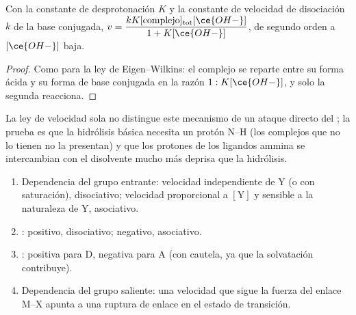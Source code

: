 \begin{proposition}\label{prop:b3:complex-mechanisms:conjugate-base}
Con la constante de desprotonación $K$ y la constante de velocidad de disociación $k$ de la
base conjugada, $v = \dfrac{kK[\text{complejo}]_{\mathrm{tot}}[\ce{OH-}]}{1 + K[\ce{OH-}]}$, de segundo orden a $[\ce{OH-}]$ baja.
\end{proposition}

\begin{proof}
Como para la ley de Eigen--Wilkins: el complejo se reparte entre su forma ácida y su
forma de base conjugada en la razón $1 : K[\ce{OH-}]$, y solo la segunda reacciona.
\end{proof}

La ley de velocidad sola no distingue este mecanismo de un ataque directo del
; la prueba es que la hidrólisis básica necesita un protón N--H (los complejos que no lo
tienen no la presentan) y que los protones de los ligandos ammina se intercambian con el disolvente mucho
más deprisa que la hidrólisis.

\begin{method}\label{met:b3:complex-mechanisms:diagnose}
\begin{enumerate}
  \item Dependencia del grupo entrante: velocidad independiente de Y (o con saturación),
        disociativo; velocidad proporcional a $[\mathrm Y]$ y sensible a la naturaleza de Y,
        asociativo.
  \item {}: positivo, disociativo; negativo, asociativo.
  \item {}: positiva para D, negativa para A (con cautela, ya que
        la solvatación contribuye).
  \item Dependencia del grupo saliente: una velocidad que sigue la fuerza del enlace M--X
        apunta a una ruptura de enlace en el estado de transición.
\end{enumerate}
\end{method}

